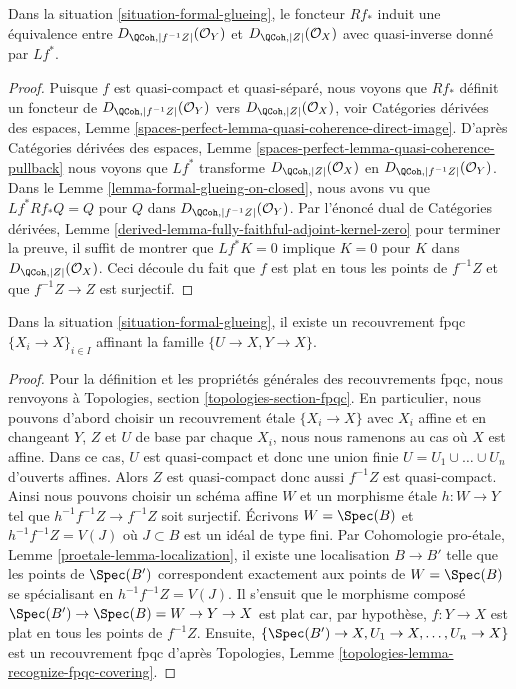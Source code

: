 \begin{lemma}
\label{lemma-derived-equivalent}
Dans la situation \ref{situation-formal-glueing}, le foncteur
$Rf_*$ induit une équivalence entre $D_{\QCoh, |f^{-1}Z|}(\mathcal{O}_Y)$
et $D_{\QCoh, |Z|}(\mathcal{O}_X)$ avec quasi-inverse donné par
$Lf^*$.
\end{lemma}

\begin{proof}  
Puisque $f$ est quasi-compact et quasi-séparé, nous voyons que $Rf_*$  
définit un foncteur de $D_{\QCoh, |f^{-1}Z|}(\mathcal{O}_Y)$  
vers $D_{\QCoh, |Z|}(\mathcal{O}_X)$, voir  
Catégories dérivées des espaces, Lemme  
\ref{spaces-perfect-lemma-quasi-coherence-direct-image}.  
D'après Catégories dérivées des espaces, Lemme  
\ref{spaces-perfect-lemma-quasi-coherence-pullback}  
nous voyons que $Lf^*$ transforme $D_{\QCoh, |Z|}(\mathcal{O}_X)$  
en $D_{\QCoh, |f^{-1}Z|}(\mathcal{O}_Y)$.  
Dans le Lemme \ref{lemma-formal-glueing-on-closed}, nous avons vu que  
$Lf^*Rf_*Q = Q$ pour $Q$ dans $D_{\QCoh, |f^{-1}Z|}(\mathcal{O}_Y)$.  
Par l'énoncé dual de Catégories dérivées, Lemme  
\ref{derived-lemma-fully-faithful-adjoint-kernel-zero}  
pour terminer la preuve, il suffit de montrer que $Lf^*K = 0$  
implique $K = 0$ pour $K$ dans $D_{\QCoh, |Z|}(\mathcal{O}_X)$.  
Ceci découle du fait que $f$ est plat en tous les points de  
$f^{-1}Z$ et que $f^{-1}Z \to Z$ est surjectif.  
\end{proof}

\begin{lemma}
\label{lemma-dominate-by-fpqc-covering}
Dans la situation \ref{situation-formal-glueing}, il existe un
recouvrement fpqc $\{X_i \to X\}_{i \in I}$ affinant la
famille $\{U \to X, Y \to X\}$.
\end{lemma}

\begin{proof}
Pour la définition et les propriétés générales des recouvrements fpqc, nous renvoyons à
Topologies, section \ref{topologies-section-fpqc}. En particulier, nous pouvons
d'abord choisir un recouvrement \'etale $\{X_i \to X\}$ avec $X_i$ affine et en
changeant $Y$, $Z$ et $U$ de base par chaque $X_i$, nous nous ramenons au cas où
$X$ est affine. Dans ce cas, $U$ est quasi-compact et donc une union finie
$U = U_1 \cup \ldots \cup U_n$ d'ouverts affines.
Alors $Z$ est quasi-compact donc aussi $f^{-1}Z$ est quasi-compact.
Ainsi nous pouvons choisir un schéma affine $W$ et un morphisme \'etale
$h : W \to Y$ tel que $h^{-1}f^{-1}Z \to f^{-1}Z$ soit surjectif.
Écrivons $W = \Spec(B)$ et $h^{-1}f^{-1}Z = V(J)$ où $J \subset B$
est un idéal de type fini.
Par Cohomologie pro-\'etale, Lemme \ref{proetale-lemma-localization}, il existe une localisation $B \to B'$ telle que les points de $\Spec(B')$ correspondent exactement aux points de $W = \Spec(B)$ se spécialisant en $h^{-1}f^{-1}Z = V(J)$. Il s'ensuit que le morphisme composé $\Spec(B') \to \Spec(B) = W \to Y \to X$ est plat car, par hypothèse, $f : Y \to X$ est plat en tous les points de $f^{-1}Z$. Ensuite, $\{\Spec(B') \to X, U_1 \to X, \ldots, U_n \to X\}$ est un recouvrement fpqc d'après Topologies, Lemme \ref{topologies-lemma-recognize-fpqc-covering}. 
\end{proof}




